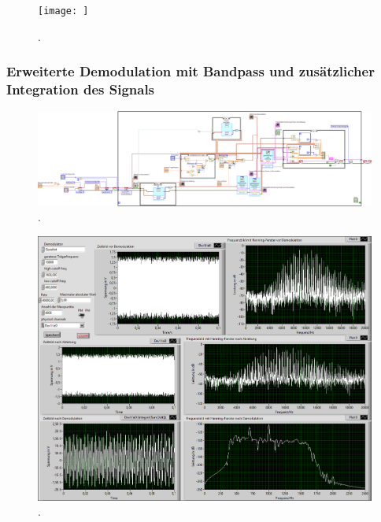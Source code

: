 \documentclass[
a4paper,
12pt,
pagesize,
ngerman
]{scrartcl}
\begin{document}
	\begin{figure}[H] %
		\centering
		\texttt{[image: ]}
		\caption{.}
	\end{figure}
\fi
	\subsubsection{Erweiterte Demodulation mit Bandpass und zusätzlicher Integration des Signals}
	
	\begin{figure}[H]
		\centering
		\includegraphics[width=1.0\textwidth]{EIRE2018Dateien/Tag4/OsziFMPM-Demod/mitBandpassUndIntegrationBilder/OsziPlusFMPMd}
		\caption{.}
	\end{figure}

	\begin{figure}[H]
		\centering
		\includegraphics[width=1.0\textwidth]{EIRE2018Dateien/Tag4/OsziFMPM-Demod/mitBandpassUndIntegrationBilder/OsziPlusFMPMp}
		\caption{.}
	\end{figure}

	
	\printbibliography
\end{document}
